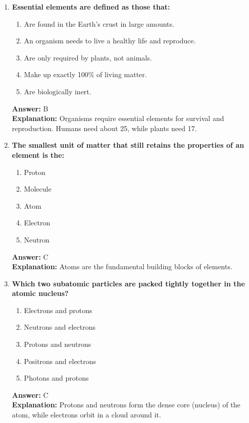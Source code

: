 \documentclass[11pt, a4paper]{article}
\begin{document}
\begin{enumerate}
\item \textbf{Essential elements are defined as those that:}
\begin{enumerate}[label=\Alph*.]
    \item Are found in the Earth's crust in large amounts.
    \item An organism needs to live a healthy life and reproduce.
    \item Are only required by plants, not animals.
    \item Make up exactly 100\% of living matter.
    \item Are biologically inert.
\end{enumerate}
\textbf{Answer:} B \\
\textbf{Explanation:} Organisms require essential elements for survival and reproduction. Humans need about 25, while plants need 17.


\item \textbf{The smallest unit of matter that still retains the properties of an element is the:}
\begin{enumerate}[label=\Alph*.]
    \item Proton
    \item Molecule
    \item Atom
    \item Electron
    \item Neutron
\end{enumerate}
\textbf{Answer:} C \\
\textbf{Explanation:} Atoms are the fundamental building blocks of elements.

\item \textbf{Which two subatomic particles are packed tightly together in the atomic nucleus?}
\begin{enumerate}[label=\Alph*.]
    \item Electrons and protons
    \item Neutrons and electrons
    \item Protons and neutrons
    \item Positrons and electrons
    \item Photons and protons
\end{enumerate}
\textbf{Answer:} C \\
\textbf{Explanation:} Protons and neutrons form the dense core (nucleus) of the atom, while electrons orbit in a cloud around it.


\end{enumerate}
\end{document}

